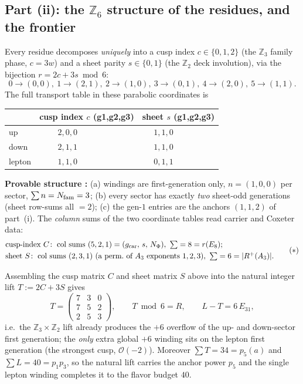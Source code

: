 \subsection{Part (ii): the $\mathbb Z_6$ structure of the residues, and the frontier}
Every residue decomposes \emph{uniquely} into a cusp index $c\in\{0,1,2\}$ (the $\mathbb Z_3$ family
phase, $c=3w$) and a sheet parity $s\in\{0,1\}$ (the $\mathbb Z_2$ deck involution), via the bijection
$r=2c+3s\bmod 6$:
\[
  0\!\to\!(0,0),\ 1\!\to\!(2,1),\ 2\!\to\!(1,0),\ 3\!\to\!(0,1),\ 4\!\to\!(2,0),\ 5\!\to\!(1,1).
\]
The full transport table in these parabolic coordinates is
\begin{center}\small
\begin{tabular}{l|ccc|ccc}
\toprule
 & \multicolumn{3}{c|}{cusp index $c$ (g1,g2,g3)} & \multicolumn{3}{c}{sheet $s$ (g1,g2,g3)} \\
\midrule
up     & $2,0,0$ & & & $1,1,0$ & & \\
down   & $2,1,1$ & & & $1,1,0$ & & \\
lepton & $1,1,0$ & & & $0,1,1$ & & \\
\bottomrule
\end{tabular}
\end{center}
\textbf{Provable structure \mE:} (a) windings are first-generation only, $n=(1,0,0)$ per sector,
$\sum n=N_{\mathrm{fam}}=3$; (b) every sector has exactly \emph{two} sheet-odd generations (sheet row-sums all
$=2$); (c) the gen-$1$ entries are the anchors $(1,1,2)$ of part~(i). The \emph{column} sums of the two
coordinate tables read carrier and Coxeter data:
\begin{equation}
\begin{aligned}
  &\text{cusp-index } C\!:\ \text{col sums }(5,2,1)=(g_{\mathrm{car}},\,s,\,N_\Phi),\ \textstyle\sum=8=r(E_8);\\
  &\text{sheet } S\!:\ \text{col sums }(2,3,1)\ \text{(a perm.\ of }A_3\text{ exponents }1,2,3),\ \textstyle\sum=6=|R^+(A_3)| .
\end{aligned}\tag{$\ast$}
\end{equation}

\begin{keybox}
Assembling the cusp matrix $C$ and sheet matrix $S$ above into the natural integer lift
$T:=2C+3S$ gives
\[
  T=\begin{pmatrix}7&3&0\\7&5&2\\2&5&3\end{pmatrix},\qquad
  T\bmod 6=R,\qquad L-T=6\,E_{31},
\]
i.e.\ the $\mathbb Z_3\times\mathbb Z_2$ lift already produces the $+6$ overflow of the up- and
down-sector first generation; the \emph{only} extra global $+6$ winding sits on the lepton first
generation (the strongest cusp, $\mathcal O(-2)$). Moreover $\sum T=34=p_5(a)$ and $\sum L=40=p_1p_3$, so
the natural lift carries the anchor power $p_5$ and the single lepton winding completes it to the flavor
budget $40$. \mE
\end{keybox}

